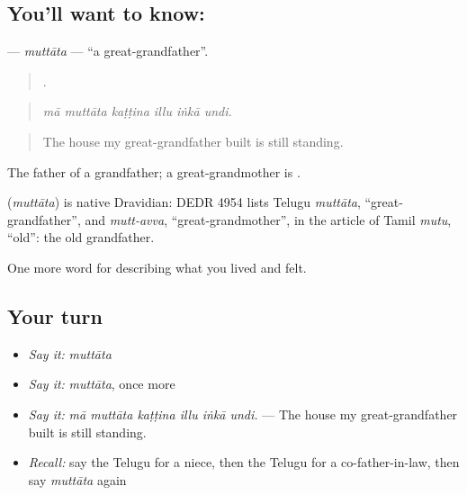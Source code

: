 \subsection*{You'll want to know: }
\textbf{} — \emph{muttāta} — \textquotedblleft{}a great-grandfather\textquotedblright{}.

\begin{quote}
     .
\end{quote}

\begin{quote}
\emph{mā muttāta kaṭṭina illu iṅkā undi.}
\end{quote}

\begin{quote}
The house my great-grandfather built is still standing.
\end{quote}

The father of a grandfather; a great-grandmother is .

\begin{cousinweb}
\textbf{} (\emph{muttāta}) is native Dravidian: DEDR 4954 lists Telugu \emph{muttāta}, \textquotedblleft{}great-grandfather\textquotedblright{}, and \emph{mutt-avva}, \textquotedblleft{}great-grandmother\textquotedblright{}, in the article of Tamil \emph{mutu}, \textquotedblleft{}old\textquotedblright{}: the old grandfather.
\end{cousinweb}

\begin{grammarlens}[title={What you've built}]
One more word for describing what you lived and felt.
\end{grammarlens}

\subsection*{Your turn}
\begin{itemize}
\raggedright
  \item \emph{Say it:} \emph{muttāta}
  \item \emph{Say it:} \emph{muttāta}, once more
  \item \emph{Say it:} \emph{mā muttāta kaṭṭina illu iṅkā undi.} — The house my great-grandfather built is still standing.
  \item \emph{Recall:} say the Telugu for a niece, then the Telugu for a co-father-in-law, then say \emph{muttāta} again
\end{itemize}

